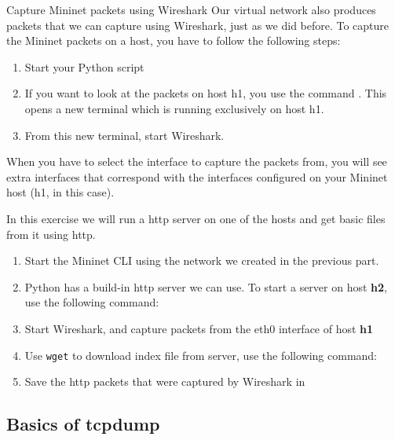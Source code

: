\begin{exercise}{Capture Mininet packets using Wireshark}
Our virtual network also produces packets that we can capture using Wireshark, just as we did before. To capture the Mininet packets on a host, you have to follow the following steps:
\begin{enumerate}
\item Start your Python script
\item If you want to look at the packets on host h1, you use the command . This opens a new terminal which is running exclusively on host h1.
\item From this new terminal, start Wireshark.
\end{enumerate}

When you have to select the interface to capture the packets from, you will see extra interfaces that correspond with the interfaces configured on your Mininet host (h1, in this case).

In this exercise we will run a http server on one of the hosts and get basic files from it using \ac{http}.
\begin{enumerate}
	\item Start the Mininet CLI using the network we created in the previous part.
	\item Python has a build-in http server we can use. To start a server on host \textbf{h2}, use the following command:
\begin{cmdblock}[gobble=2]
\end{cmdblock}
	\item Start Wireshark, and capture packets from the eth0 interface of host \textbf{h1}
	\item Use \texttt{wget} to download index file from server, use the following command:
\begin{cmdblock}[gobble=2]
\end{cmdblock}
	\item Save the \ac{http} packets that were captured by Wireshark in 
\end{enumerate}

\end{exercise}



\newpage
\subsection{Basics of tcpdump}

